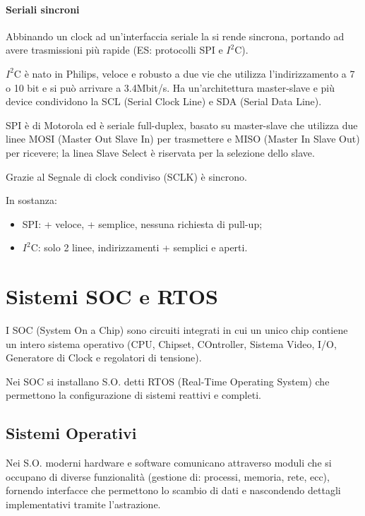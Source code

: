 \paragraph{Seriali sincroni}\label{seriali-sincroni}

Abbinando un clock ad un'interfaccia seriale la si rende sincrona,
portando ad avere trasmissioni più rapide (ES: protocolli SPI e
\(I^{2}\)C).

\(I^{2}\)C è nato in Philips, veloce e robusto a due vie che utilizza
l'indirizzamento a 7 o 10 bit e si può arrivare a 3.4Mbit/s. Ha
un'architettura master-slave e più device condividono la SCL (Serial
Clock Line) e SDA (Serial Data Line).

SPI è di Motorola ed è seriale full-duplex, basato su master-slave che
utilizza due linee MOSI (Master Out Slave In) per trasmettere e MISO
(Master In Slave Out) per ricevere; la linea Slave Select è riservata
per la selezione dello slave.

Grazie al Segnale di clock condiviso (SCLK) è sincrono.

In sostanza:

\begin{itemize}
\item
  SPI: + veloce, + semplice, nessuna richiesta di pull-up;
\item
  \(I^{2}\)C: solo 2 linee, indirizzamenti + semplici e aperti.
\end{itemize}

\section{Sistemi SOC e RTOS}\label{sistemi-soc-e-rtos}

I SOC (System On a Chip) sono circuiti integrati in cui un unico chip
contiene un intero sistema operativo (CPU, Chipset, COntroller, Sistema
Video, I/O, Generatore di Clock e regolatori di tensione).

Nei SOC si installano S.O. detti RTOS (Real-Time Operating System) che
permettono la configurazione di sistemi reattivi e completi.

\subsection{Sistemi Operativi}\label{sistemi-operativi}

Nei S.O. moderni hardware e software comunicano attraverso moduli che si
occupano di diverse funzionalità (gestione di: processi, memoria, rete,
ecc), fornendo interfacce che permettono lo scambio di dati e
nascondendo dettagli implementativi tramite l'astrazione.

